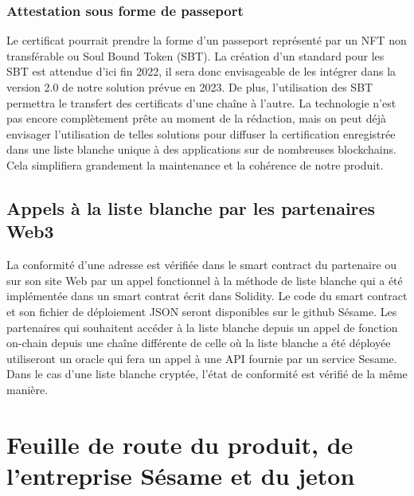 ﻿\documentclass[a4paper]{article}
\begin{document}
\subsubsection{Attestation sous forme de passeport}
Le certificat pourrait prendre la forme d'un passeport représenté par un NFT non transférable ou Soul Bound Token (SBT). La création d'un standard pour les SBT est attendue d’ici fin 2022, il sera donc envisageable de les intégrer dans la version 2.0 de notre solution prévue en 2023.
De plus, l’utilisation des SBT permettra le transfert des certificats d'une chaîne à l'autre. La technologie n'est pas encore complètement prête au moment de la rédaction, mais on peut déjà envisager l'utilisation de telles solutions pour diffuser la certification enregistrée dans une liste blanche unique à des applications sur de nombreuses blockchains. Cela simplifiera grandement la maintenance et la cohérence de notre produit.

\subsection{Appels à la liste blanche par les partenaires Web3}
La conformité d’une adresse est vérifiée dans le smart contract du partenaire ou sur son site Web par un appel fonctionnel à la méthode de liste blanche qui a été implémentée dans un smart contrat écrit dans Solidity. Le code du smart contract et son fichier de déploiement JSON seront disponibles sur le github Sésame.
Les partenaires qui souhaitent accéder à la liste blanche depuis un appel de fonction on-chain depuis une chaîne différente de celle où la liste blanche a été déployée utiliseront un oracle qui fera un appel à une API fournie par un service Sesame.
Dans le cas d'une liste blanche cryptée, l'état de conformité est vérifié de la même manière.

\newpage
\section{Feuille de route du produit, de l’entreprise Sésame et du jeton }
\end{document}
